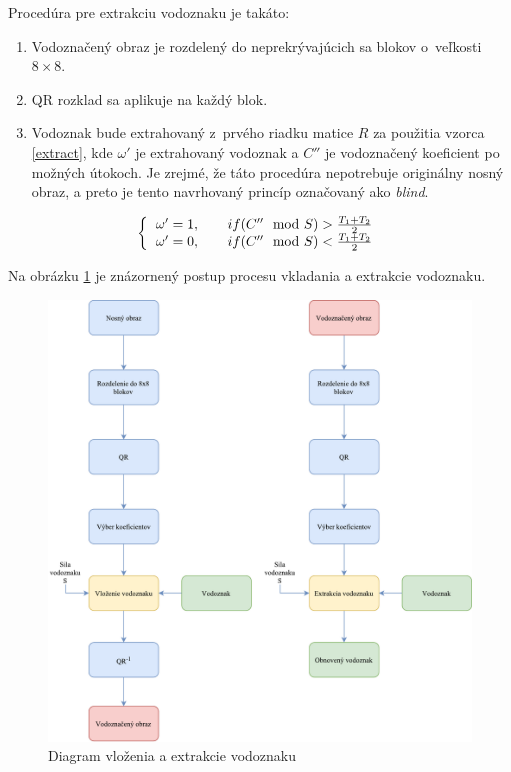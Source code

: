Procedúra pre extrakciu vodoznaku je takáto:
\begin{enumerate}
\item Vodoznačený obraz je rozdelený do neprekrývajúcich sa blokov o~veľkosti $8\times8$.
\item QR rozklad sa aplikuje na každý blok.
\item Vodoznak bude extrahovaný z~prvého riadku matice $R$ za použitia vzorca \ref{extract}, kde $\omega'$ je extrahovaný vodoznak a $C''$ je vodoznačený koeficient po možných útokoch. Je zrejmé, že táto procedúra nepotrebuje originálny nosný obraz, a preto je tento navrhovaný princíp označovaný ako {\it blind}.
\end{enumerate}

\begin{equation} \label{extract}
\left \{
  \begin{tabular}{c}
  $\omega' = 1,\qquad if (C''\mod S) > \frac{T_1+T_2}{2}$ \\
  $\omega' = 0,\qquad if (C''\mod S) < \frac{T_1+T_2}{2}$
  \end{tabular}
\right.
\end{equation}


Na obrázku \ref{fig:embed-extract} je znázornený postup procesu vkladania a extrakcie vodoznaku.

\begin{figure}
    \centering
    \includegraphics[scale=0.59]{obrazky/embed-extract}
    \caption{Diagram vloženia a extrakcie vodoznaku}
    \label{fig:embed-extract}
\end{figure}

